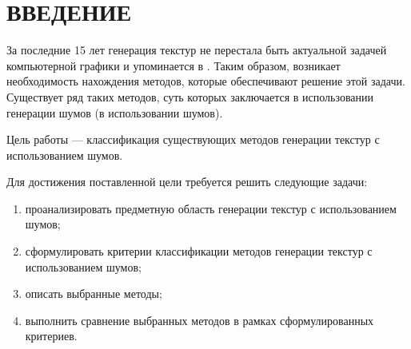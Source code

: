 \chapter*{ВВЕДЕНИЕ}

За последние 15 лет генерация текстур не перестала быть актуальной задачей компьютерной графики и упоминается в 
\cite{8942651,10042545,TRINCHAOANDRADE201228,doi:10.1080/15394450902996601,Groueix_2018_CVPR,cabral1993imaging}.
Таким образом, возникает необходимость нахождения методов, которые обеспечивают решение этой задачи.
Существует ряд таких методов, суть которых заключается в использовании генерации шумов (в использовании шумов).

Цель работы --- классификация существующих методов генерации текстур с использованием шумов.

Для достижения поставленной цели требуется решить следующие задачи:
\begin{enumerate}
	\item проанализировать предметную область генерации текстур с использованием шумов;
	\item сформулировать критерии классификации методов генерации текстур с использованием шумов;
	\item описать выбранные методы;
	\item выполнить сравнение выбранных методов в рамках сформулированных критериев.
\end{enumerate}